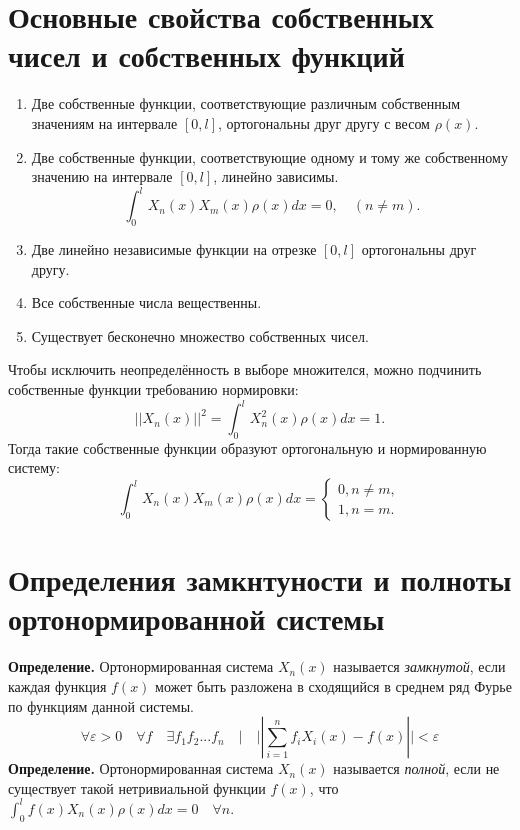\documentclass[12pt, a4paper]{report}
\begin{document}
\section{Основные свойства собственных чисел и собственных функций}
\begin{enumerate}
	\item Две собственные функции, соответствующие различным собственным значениям на интервале $[0, l]$, ортогональны друг другу с весом $\rho(x)$.
	\item Две собственные функции, соответствующие одному и тому же собственному значению на интервале $[0, l]$, линейно зависимы.
\[ \int_{0}^{l} X_{n} (x) X_{m} (x) \rho (x) dx = 0, \quad (n \neq m). \]
	\item Две линейно независимые функции на отрезке $[0, l]$ ортогональны друг другу.
	\item Все собственные числа вещественны.
	\item Существует бесконечно множество собственных чисел.
\end{enumerate}

Чтобы исключить неопределённость в выборе множителся, можно подчинить собственные функции требованию нормировки:
\[ ||X_n (x) ||^2 = \int_{0}^{l}  X^2_n (x) \rho (x) dx = 1. \] 
Тогда такие собственные функции образуют ортогональную и нормированную систему:
\begin{equation*}
	 \int_{0}^{l}  X_{n} (x) X_{m} (x) \rho (x) dx =  \begin{cases}
	0, n \neq m, \\
	1, n = m.
	\end{cases}
\end{equation*}

\section{Определения замкнтуности и полноты ортонормированной системы}
\textbf{Определение.} Ортонормированная система ${X_n (x)}$  называется \textit{замкнутой}, если каждая функция $f(x)$ может быть разложена в сходящийся в среднем ряд Фурье по функциям данной системы.
\[ \forall \varepsilon > 0 \quad \forall f \quad \exists f_1 f_2 ... f_n \quad | \quad ||\sum_{i = 1}^n f_i X_i (x) - f(x) || < \varepsilon  \]
\textbf{Определение.} Ортонормированная система ${X_n (x)}$  называется \textit{полной}, если не существует такой нетривиальной функции $f(x)$, что $\int_{0}^{l} f(x) X_n (x) \rho (x) dx = 0 \quad \forall n$.
\end{document}

